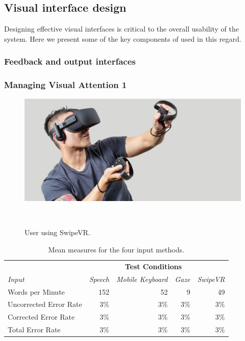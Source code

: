 \subsection{Visual interface design}
Designing effective visual interfaces is critical to the overall usability of the system. Here we present some of the key components of used in this regard. 

\subsubsection{Feedback and output interfaces}
\subsubsection{Managing Visual Attention 1}


\begin{figure}
  \centering
  \includegraphics[width=1\columnwidth]{figures/manVR}
  \caption{User using SwipeVR.}~\label{fig:figure2}
\end{figure}


\begin{table}
  \centering
  \begin{tabular}{l r r r r}
    & & \multicolumn{2}{c}{\small{\textbf{Test Conditions}}} \\
    \cmidrule(r){2-5}
    {\small\textit{Input}}
    & {\small \textit{Speech}}
    & {\small \textit{Mobile Keyboard}}
    & {\small \textit{Gaze}}
    & {\small \textit{SwipeVR}} \\
    \midrule
    Words per Minute & 152 & 52 & 9 & 49 \\
    Uncorrected Error Rate & 3\% & 3\% & 3\% & 3\% \\
    Corrected Error Rate & 3\% & 3\% & 3\% & 3\%\\
    Total Error Rate & 3\% & 3\% & 3\% & 3\%\\
  \end{tabular}
  \caption{ Mean measures for the four input methods.}~\label{tab:tableResults}
\end{table}


